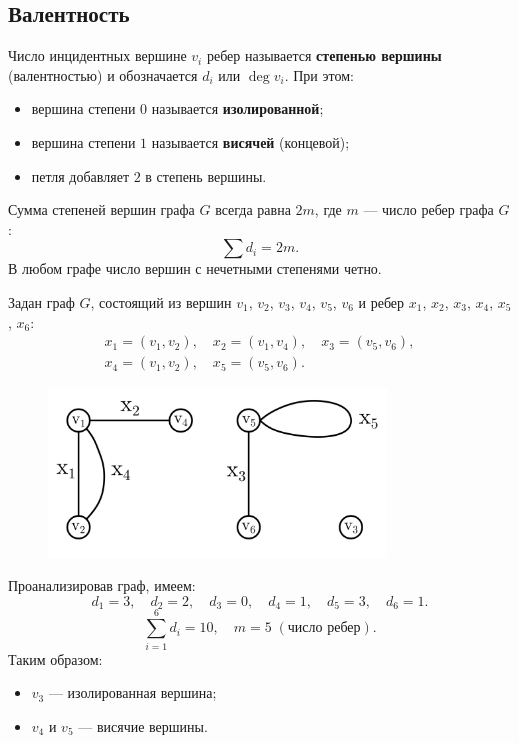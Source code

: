 \subsection{Валентность}

Число инцидентных вершине \(v_i\) ребер называется \textbf{степенью вершины} (валентностью) и обозначается \(d_i\) или \(\deg v_i\). При этом:
\begin{itemize}
    \item вершина степени \(0\) называется \textbf{изолированной};
    \item вершина степени \(1\) называется \textbf{висячей} (концевой);
    \item петля добавляет \(2\) в степень вершины.
\end{itemize}

\begin{theorem*}
    Сумма степеней вершин графа \(G\) всегда равна \(2m\), где \(m\) --- число ребер графа \(G\):
    \[
        \sum d_i = 2m.
    \]
    В любом графе число вершин с нечетными степенями четно.
\end{theorem*}

\begin{example*}
    Задан граф \(G\), состоящий из вершин \(v_1\), \(v_2\), \(v_3\), \(v_4\), \(v_5\), \(v_6\) и ребер \(x_1\), \(x_2\), \(x_3\), \(x_4\), \(x_5\), \(x_6\):
    \begin{gather*}
        x_1 = (v_1, v_2),
        \quad
        x_2 = (v_1, v_4),
        \quad
        x_3 = (v_5, v_6),
        \\
        x_4 = (v_1, v_2),
        \quad
        x_5 = (v_5, v_6).
    \end{gather*}

    \begin{figure}[H]
        \centering
        \includegraphics[width=0.8\textwidth]{./images/graph-example.png}
    \end{figure}

    \noindent Проанализировав граф, имеем:
    \[
        d_1 = 3,
        \quad
        d_2 = 2,
        \quad
        d_3 = 0,
        \quad
        d_4 = 1,
        \quad
        d_5 = 3,
        \quad
        d_6 = 1.
    \]
    \[
        \sum_{i = 1}^6 d_i = 10,
        \quad
        m = 5 \; (\text{число ребер}).
    \]
    Таким образом:
    \begin{itemize}
        \item \(v_3\) --- изолированная вершина;
        \item \(v_4\) и \(v_5\) --- висячие вершины.
    \end{itemize}
\end{example*}

